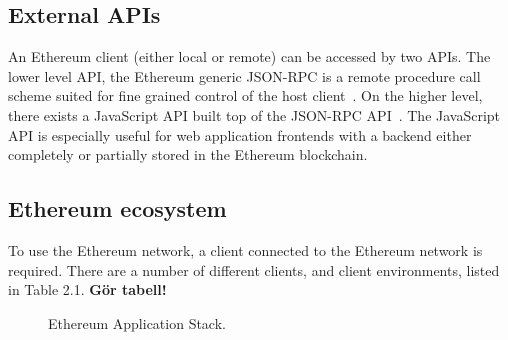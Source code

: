 \subsection{External APIs}
An Ethereum client (either local or remote) can be accessed by two APIs. The lower level API, the Ethereum generic JSON-RPC is a remote procedure call scheme suited for fine grained control of the host client~\cite{generic-json-rpc}. On the higher level, there exists a JavaScript API built top of the JSON-RPC API~\cite{javascript-api}. The JavaScript API is especially useful for web application frontends with a backend either completely or partially stored in the Ethereum blockchain.

\subsection{Ethereum ecosystem}
To use the Ethereum network, a client connected to the Ethereum network is required. There are a number of different clients, and client environments, listed in Table 2.1. \textbf{Gör tabell!}

\begin{figure}[ht]
\centering
{}
\caption{Ethereum Application Stack.}
\end{figure}

